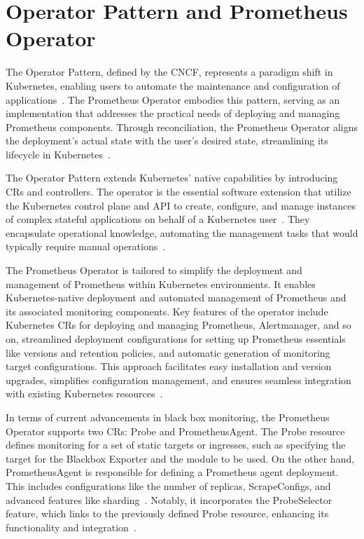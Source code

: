\section{Operator Pattern and Prometheus Operator}

The Operator Pattern, defined by the \ac{CNCF}, represents a paradigm shift in Kubernetes, enabling users to automate the maintenance and configuration of applications~\parencite{kubernetesOperatorPattern}. The Prometheus Operator embodies this pattern, serving as an implementation that addresses the practical needs of deploying and managing Prometheus components. Through reconciliation, the Prometheus Operator aligns the deployment's actual state with the user's desired state, streamlining its lifecycle in Kubernetes~\parencite{prometheusoperatorIntroduction2020}.

The Operator Pattern extends Kubernetes' native capabilities by introducing \ac{CRs} and controllers. The operator is the essential software extension that utilize the Kubernetes control plane and API to create, configure, and manage instances of complex stateful applications on behalf of a Kubernetes user~\parencite{dobiesKubernetesOperators}. They encapsulate operational knowledge, automating the management tasks that would typically require manual operations~\parencite{cncfCNCFOperatorWhite}. 

The Prometheus Operator is tailored to simplify the deployment and management of Prometheus within Kubernetes environments. It enables Kubernetes-native deployment and automated management of Prometheus and its associated monitoring components. Key features of the operator include Kubernetes \ac{CRs} for deploying and managing Prometheus, Alertmanager, and so on, streamlined deployment configurations for setting up Prometheus essentials like versions and retention policies, and automatic generation of monitoring target configurations. This approach facilitates easy installation and version upgrades, simplifies configuration management, and ensures seamless integration with existing Kubernetes resources~\parencite{prometheusoperatorIntroduction2020}. 

In terms of current advancements in black box monitoring, the Prometheus Operator supports two \ac{CRs}: Probe and PrometheusAgent. The Probe resource defines monitoring for a set of static targets or ingresses, such as specifying the target for the Blackbox Exporter and the module to be used. On the other hand, PrometheusAgent is responsible for defining a Prometheus agent deployment. This includes configurations like the number of replicas, ScrapeConfigs, and advanced features like sharding~\parencite{prometheusoperatorPrometheusAgentSupport}. Notably, it incorporates the ProbeSelector feature, which links to the previously defined Probe resource, enhancing its functionality and integration~\parencite{prometheusoperatorAPIReference}.

